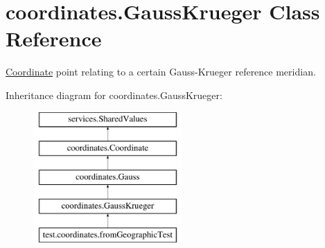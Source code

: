 \hypertarget{classcoordinates_1_1_gauss_krueger}{}\section{coordinates.\+Gauss\+Krueger Class Reference}
\label{classcoordinates_1_1_gauss_krueger}


\hyperlink{classcoordinates_1_1_coordinate}{Coordinate} point relating to a certain Gauss-\/\+Krueger reference meridian.  


Inheritance diagram for coordinates.\+Gauss\+Krueger\+:\begin{figure}[H]
\begin{center}
\leavevmode
\includegraphics[height=5.000000cm]{classcoordinates_1_1_gauss_krueger}
\end{center}
\end{figure}
